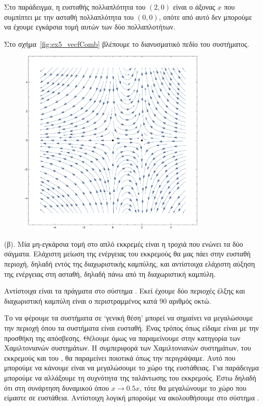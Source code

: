 \begin{solution}
    Στο παράδειγμα, η ευσταθής πολλαπλότητα του \( (2, 0) \) είναι ο άξονας
    \( x \) που συμπίπτει με την ασταθή πολλαπλότητα του \( (0, 0) \), οπότε από
    αυτό δεν μπορούμε να έχουμε εγκάρσια τομή αυτών των δύο πολλαπλοτήτων.

    Στο σχήμα~\eqref{fig:ex5_vecfComb} βλέπουμε το διανυσματικό πεδίο του
    συστήματος.
    \begin{figure}[h!]
        \centering
        \includegraphics[width=0.8\textwidth]{figures/ex5_vecfComb.pdf}
        \caption{}
        \label{fig:ex5_vecfComb}
    \end{figure}

    (β). Μία μη-εγκάρσια τομή στο απλό εκκρεμές είναι η τροχιά που ενώνει τα δύο
    σάγματα. Ελάχιστη μείωση της ενέργειας του εκκρεμούς θα μας πάει στην
    ευσταθή περιοχή, δηλαδή εντός της διαχωριστικής καμπύλης, και αντίστοιχα ελάχιστη
    αύξηση της ενέργειας στη ασταθή, δηλαδή πάνω από τη διαχωριστική καμπύλη.

    Αντίστοιχα είναι τα πράγματα στο σύστημα . Εκεί έχουμε δύο
    περιοχές έλξης και διαχωριστική καμπύλη είναι ο περιστραμμένος κατά
    \( 90 \) αριθμός οκτώ.

    Το να φέρουμε τα συστήματα σε \enquote*{γενική θέση} μπορεί να σημαίνει να
    μεγαλώσουμε την περιοχή όπου τα συστήματα είναι ευσταθή. Ένας τρόπος όπως
    είδαμε είναι με την προσθήκη της απόσβεσης. Θέλουμε όμως να
    παραμείνουμε στην κατηγορία των Χαμιλτονιανών συστημάτων. Η συμπεριφορά των
    Χαμιλτονιανών συστημάτων, του εκκρεμούς και του , θα παραμείνει
    ποιοτικά όπως την περιγράψαμε. Αυτό που μπορούμε να κάνουμε είναι να
    μεγαλώσουμε το χώρο της ευστάθειας. Για παράδειγμα μπορούμε να αλλάξουμε τη συχνότητα
    της ταλάντωσης του εκκρεμούς. Έστω δηλαδή ότι στη συνάρτηση δυναμικού
    όπου \( x \to 0.5x \), τότε θα μεγαλώνουμε το χώρο που είμαστε σε ευστάθεια.
    Αντίστοιχη λογική μπορούμε να ακολουθήσουμε στο σύστημα .
\end{solution}
